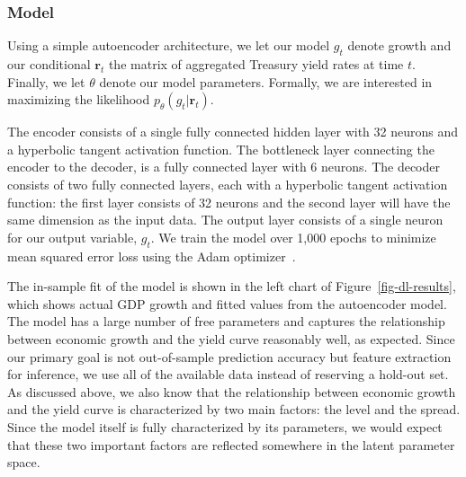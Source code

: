 \documentclass{article}
\theoremstyle{plain}
\theoremstyle{definition}
\theoremstyle{remark}
\begin{document}
\subsubsection{Model}\label{model}


Using a simple autoencoder architecture, we let our model \(g_t\) denote growth and our conditional \(\mathbf{r}_t\) the matrix of aggregated Treasury yield rates at time \(t\). Finally, we let \(\theta\) denote our model parameters. Formally, we are interested in maximizing the likelihood \(p_{\theta}(g_t|\mathbf{r}_t)\). 

The encoder consists of a single fully connected hidden layer with 32 neurons and a hyperbolic tangent activation function. The bottleneck layer connecting the encoder to the decoder, is a fully connected layer with 6 neurons. The decoder consists of two fully connected layers, each with a hyperbolic tangent activation function: the first layer consists of 32 neurons and the second layer will have the same dimension as the input data. The output layer consists of a single neuron for our output variable, \(g_t\). We train the model over 1,000 epochs to minimize mean squared error loss using the Adam optimizer~\citep{kingma2017adam}.

The in-sample fit of the model is shown in the left chart of Figure~\ref{fig-dl-results}, which shows actual GDP growth and fitted values from the autoencoder
model. The model has a large number of free parameters and captures the relationship between economic growth and the yield curve reasonably well, as expected. Since our primary goal is not out-of-sample prediction accuracy but feature extraction for inference, we use all of the available data instead of reserving a hold-out set. As discussed above, we also know that the relationship between economic growth and the yield curve is characterized by two main factors: the level and the spread. Since the model itself is fully characterized by its parameters, we would expect that these two important factors are reflected somewhere in the latent parameter space. 
\end{document}
